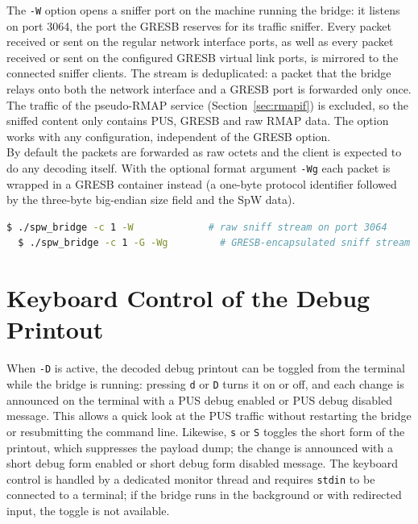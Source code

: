 The \texttt{-W} option opens a sniffer port on the machine running the bridge:
it listens on port 3064, the port the \gls{GRESB} reserves for its traffic
sniffer. Every packet received or sent on the regular network interface ports,
as well as every packet received or sent on the configured GRESB virtual link
ports, is mirrored to the connected sniffer clients. The stream is
deduplicated: a packet that the bridge relays onto both the network interface
and a GRESB port is forwarded only once. The traffic of the
pseudo-\gls{RMAP} service (Section~\ref{sec:rmapif}) is excluded, so the
sniffed content only contains \gls{PUS}, GRESB and raw \gls{RMAP} data. The
option works with any configuration, independent of the GRESB option.
\\
By default the packets are forwarded as raw octets and the client is expected
to do any decoding itself. With the optional format argument \texttt{-Wg}
each packet is wrapped in a GRESB container instead (a one-byte protocol
identifier followed by the three-byte big-endian size field and the \gls{SpW}
data).

\noindent
\begin{lstlisting}[language=bash]
  $ ./spw_bridge -c 1 -W             # raw sniff stream on port 3064
  $ ./spw_bridge -c 1 -G -Wg         # GRESB-encapsulated sniff stream
\end{lstlisting}

\section{Keyboard Control of the Debug Printout}
\label{sec:kbd}

When \texttt{-D} is active, the decoded debug printout can be toggled from the
terminal while the bridge is running: pressing \texttt{d} or \texttt{D} turns
it on or off, and each change is announced on the terminal with a
{\ttfamily PUS debug enabled} or {\ttfamily PUS debug disabled} message. This
allows a quick look at the PUS traffic without restarting the bridge or
resubmitting the command line. Likewise, \texttt{s} or \texttt{S} toggles the
short form of the printout, which suppresses the payload dump; the change is
announced with a {\ttfamily short debug form enabled} or
{\ttfamily short debug form disabled} message. The keyboard control is handled
by a dedicated monitor thread and requires \texttt{stdin} to be connected to a
terminal; if the bridge runs in the background or with redirected input, the
toggle is not available.

